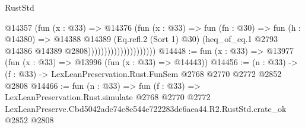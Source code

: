 \begin{lexlean}{RustStd}
\begin{coremodule}
                                      @14357
                                        (fun (x : @33) =>
                                        @14376
                                          (fun (x : @33) =>
                                          fun (fn : @30) =>
                                          fun (h : @14380) =>
                                          @14388
                                            @14389
                                            (Eq.refl.{2} (Sort 1) @30)
                                            (heq_of_eq.{1}
                                              @2793
                                              @14386
                                              @14389
                                              @2808)))))))))))))))))))))
@14448 := fun (x : @33) => @13977 (fun (x : @33) => @13996 (fun (x : @33) => @14443))
@14456 := (n : @33) -> (f : @33) -> LexLeanPreservation.Rust.FunSem @2768 @2770 @2772 @2852 @2808
@14466 := fun (n : @33) =>
  fun (f : @33) =>
  LexLeanPreservation.Rust.simulate
    @2768
    @2770
    @2772
    LexLeanPreserve.Cbd5042ade74c8e544e722283de6aea44.R2.RustStd.crate_ok
    @2852
    @2808
\end{coremodule}
\end{lexlean}
